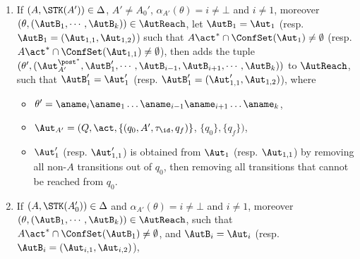 {\begin{minipage}{0.95\textwidth}
\begin{enumerate}
    \item If $(A,\STK(A')) \in\Delta$, $A'\neq A_0'$, $\alpha_{A'}(\theta) = i \neq\bot$ and $i\neq 1$, moreover $(\theta, (\AutB_1,\cdots,\AutB_k)) \in \AutReach$, let $\AutB_1=\Aut_1$ (resp. $\AutB_1=(\Aut_{1,1},\Aut_{1,2})$) such that $A\act^*\cap\ConfSet(\Aut_1)\neq \emptyset$ (resp. $A\act^*\cap\ConfSet(\Aut_{1,1})\neq\emptyset$), 
        then adds the tuple $(\theta', (\Aut_{A'}^{\post^*},\AutB_1',\cdots,\AutB_{i-1},\AutB_{i+1},\cdots,\AutB_{k}))$ to $\AutReach$, such that $\AutB_1'=\Aut_1'$ (resp. $\AutB_1'=(\Aut_{1,1}',\Aut_{1,2})$), where
        \begin{itemize}
            \item $\theta' = \aname_i\aname_1\dots\aname_{i-1}\aname_{i+1}\dots\aname_k$,
            \item $\Aut_{A'} = (Q, \act, \{(q_0, A', \tau_{\id}, q_f)\}$, $\{q_0\},\{q_f\})$,
            \item $\Aut_1'$ (resp. $\Aut_{1,1}'$) is obtained from $\Aut_1$ (resp. $\Aut_{1,1}$) by 
                removing all non-$A$ transitions out of $q_0$, then removing all transitions that cannot be reached from $q_0$.
        \end{itemize}
    \item If $(A,\STK(A_0')) \in\Delta$ and $\alpha_{A'}(\theta) = i \neq\bot$ and $i\neq 1$, moreover $(\theta, (\AutB_1,\cdots,\AutB_k)) \in \AutReach$, such that $A\act^*\cap\ConfSet(\AutB_1)\neq \emptyset$, and $\AutB_i=\Aut_i$ (resp. $\AutB_i = (\Aut_{i,1},\Aut_{i,2})$),

\end{enumerate}
\end{minipage}}
